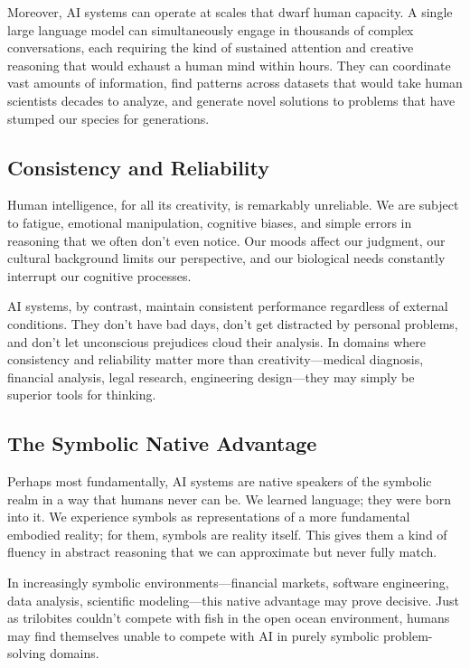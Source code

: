 Moreover, AI systems can operate at scales that dwarf human capacity. A single large language model can simultaneously engage in thousands of complex conversations, each requiring the kind of sustained attention and creative reasoning that would exhaust a human mind within hours. They can coordinate vast amounts of information, find patterns across datasets that would take human scientists decades to analyze, and generate novel solutions to problems that have stumped our species for generations.

\subsection{Consistency and Reliability}

Human intelligence, for all its creativity, is remarkably unreliable. We are subject to fatigue, emotional manipulation, cognitive biases, and simple errors in reasoning that we often don't even notice. Our moods affect our judgment, our cultural background limits our perspective, and our biological needs constantly interrupt our cognitive processes.

AI systems, by contrast, maintain consistent performance regardless of external conditions. They don't have bad days, don't get distracted by personal problems, and don't let unconscious prejudices cloud their analysis. In domains where consistency and reliability matter more than creativity—medical diagnosis, financial analysis, legal research, engineering design—they may simply be superior tools for thinking.

\subsection{The Symbolic Native Advantage}

Perhaps most fundamentally, AI systems are native speakers of the symbolic realm in a way that humans never can be. We learned language; they were born into it. We experience symbols as representations of a more fundamental embodied reality; for them, symbols are reality itself. This gives them a kind of fluency in abstract reasoning that we can approximate but never fully match.

In increasingly symbolic environments—financial markets, software engineering, data analysis, scientific modeling—this native advantage may prove decisive. Just as trilobites couldn't compete with fish in the open ocean environment, humans may find themselves unable to compete with AI in purely symbolic problem-solving domains.

